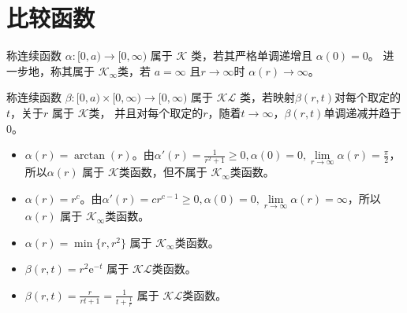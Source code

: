 \section{比较函数}\label{3Aref}

\begin{definition}
  称连续函数 $\alpha : [0, a) \rightarrow [0, \infty)$ 属于 $\mathcal{K}$ 类，若其严格单调递增且 $\alpha (0) =0$。
  进一步地，称其属于 $\mathcal{K}_{\infty}$类，若 $a = \infty$ 且$r \rightarrow \infty$时
  $\alpha (r) \rightarrow \infty$。
\end{definition}

\begin{definition}
  称连续函数 $\beta : [0, a) \times [0, \infty) \rightarrow [0,
  \infty)$ 属于 $\mathcal{K}\mathcal{L}$ 类，若映射$\beta (r, t)$对每个取定的$t$，关于$r$ 属于 $\mathcal{K}$类，
  并且对每个取定的$r$，随着$t
  \rightarrow \infty$，$\beta (r, t)$单调递减并趋于$ 0$。
\end{definition}

\begin{example}  
  \begin{itemize}[leftmargin=1em]
    \item $\alpha (r) = \arctan (r)$。由$\alpha' (r) = \frac{1}{r^2 + 1} \geq 0,
    \alpha (0) = 0, \lim\limits_{r \rightarrow \infty} \alpha (r) = \frac{\pi}{2}$，
    所以$\alpha (r)$ 属于 $\mathcal{K}$类函数，但不属于 $\mathcal{K}_{\infty}$类函数。
    
    \item $\alpha (r) = r^c$。由$ \alpha' (r) = c r^{c-1} \geq 0, \alpha (0) = 0, \lim\limits_{r
    \rightarrow \infty} \alpha (r) = \infty$，所以 $\alpha (r)$ 属于 $\mathcal{K}_{\infty}$类函数。
    
    \item $\alpha (r) = \min \{ r, r^2 \}$ 属于 $\mathcal{K}_{\infty}$类函数。
    
    \item $\beta (r, t) = r^2 \mathrm{e}^{- t}$ 属于    $\mathcal{K}\mathcal{L}$类函数。
    \item $\beta (r, t) = \frac{r}{rt+1}=\frac{1}{t+\frac1r}$ 属于 $\mathcal{K}\mathcal{L}$类函数。
  \end{itemize}
\end{example}

